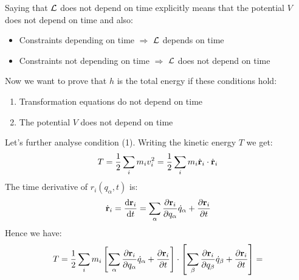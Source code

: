 Saying that $\mathcal{L}$ does not depend on time explicitly means that the potential $V$ does not depend on time and also:
\begin{itemize}
    \item Constraints depending on time $\Rightarrow$ $\mathcal{L}$ depends on time
    \item Constraints not depending on time $\Rightarrow$ $\mathcal{L}$ does not depend on time
\end{itemize}
Now we want to prove that $h$ is the total energy if these conditions hold:
\begin{enumerate}
    \item Transformation equations do not depend on time
    \item The potential $V$ does not depend on time
\end{enumerate}
Let's further analyse condition (1). Writing the kinetic energy $T$ we get:
\begin{equation}
    T = \dfrac{1}{2}\displaystyle\sum_i m_i v_i^2 = \dfrac{1}{2}\displaystyle\sum_i m_i \dot{\vb{r}}_i \cdot \dot{\vb{r}}_i
\end{equation}
The time derivative of $r_i(q_{\alpha},t)$ is:
\begin{equation}
    \dot{\vb{r}}_i = \dfrac{\dd{\vb{r}_i}}{\dd{t}} = \displaystyle\sum_{\alpha}\dfrac{\partial \vb{r}_i}{\partial q_{\alpha}}\dot{q}_{\alpha} + \dfrac{\partial \vb{r}_i}{\partial t}
\end{equation}
Hence we have:
\begin{equation}
    T = \dfrac{1}{2}\displaystyle\sum_i m_i \left[\displaystyle\sum_{\alpha}\dfrac{\partial \vb{r}_i}{\partial q_{\alpha}}\dot{q}_{\alpha} + \dfrac{\partial \vb{r}_i}{\partial t}\right] \cdot \left[\displaystyle\sum_{\beta}\dfrac{\partial \vb{r}_i}{\partial q_{\beta}}\dot{q}_{\beta} + \dfrac{\partial \vb{r}_i}{\partial t}\right] =
\end{equation}

